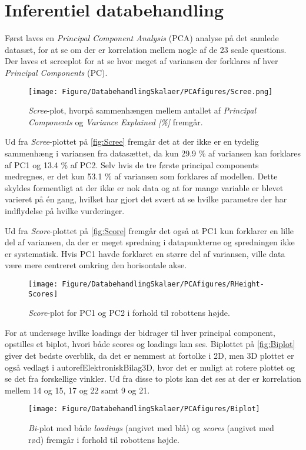 \section{Inferentiel databehandling}
\label{sec:inferentiel}
%
Først laves en \textit{Principal Component Analysis} (PCA) analyse på det samlede datasæt, for at se om der er korrelation mellem nogle af de 23 scale questions. Der laves et screeplot for at se hvor meget af variansen der forklares af hver \textit{Principal Components} (PC).

\begin{figure}[H]
\centering
\texttt{[image: Figure/DatabehandlingSkalaer/PCAfigures/Scree.png]}
\caption{\textit{Scree}-plot, hvorpå sammenhængen mellem antallet af \textit{Principal Components} og \textit{Variance Explained [\%]} fremgår.}
\label{fig:Scree}
\end{figure}
\noindent
%

Ud fra \textit{Scree}-plottet på \autoref{fig:Scree} fremgår det at der ikke er en tydelig sammenhæng i variansen fra datasættet, da kun 29.9 \% af variansen kan forklares af PC1 og 13.4 \% af PC2. Selv hvis de tre første principal components medregnes, er det kun 53.1 \% af variansen som forklares af modellen. Dette skyldes formentligt at der ikke er nok data og at for mange variable er blevet varieret på én gang, hvilket har gjort det svært at se hvilke parametre der har indflydelse på hvilke vurderinger.

Ud fra \textit{Score}-plottet på \autoref{fig:Score} fremgår det også at PC1 kun forklarer en lille del af variansen, da der er meget spredning i datapunkterne og spredningen ikke er systematisk. Hvis PC1 havde forklaret en større del af variansen, ville data være mere centreret omkring den horisontale akse.
%
\begin{figure}[H]
\centering
\texttt{[image: Figure/DatabehandlingSkalaer/PCAfigures/RHeight-Scores]}
\caption{\textit{Score}-plot for PC1 og PC2 i forhold til robottens højde.}
\label{fig:Score}
\end{figure}
\noindent
%
For at undersøge hvilke loadings der bidrager til hver principal component, opstilles et biplot, hvori både scores og loadings kan ses. Biplottet på \autoref{fig:Biplot} giver det bedste overblik, da det er nemmest at fortolke i 2D, men 3D plottet er også vedlagt i autoref{ElektroniskBilag3D}, hvor det er muligt at rotere plottet og se det fra forskellige vinkler. Ud fra disse to plots kan det ses at der er korrelation mellem 14 og 15, 17 og 22 samt 9 og 21.
%
\begin{figure}[H]
\centering
\texttt{[image: Figure/DatabehandlingSkalaer/PCAfigures/Biplot]}
\caption{\textit{Bi}-plot med både \textit{loadings} (angivet med blå) og \textit{scores} (angivet med rød) fremgår i forhold til robottens højde.}
\label{fig:Biplot}
\end{figure}
\noindent
%

